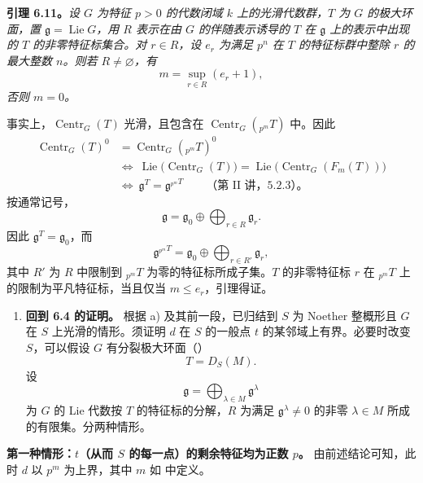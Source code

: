 \textbf{引理 6.11。}\emph{设 \(G\) 为特征 \(p>0\) 的代数闭域 \(k\) 上的光滑代数群，\(T\) 为 \(G\) 的极大环面，置 \(\mathfrak g=\operatorname{Lie}G\)，用 \(R\) 表示在由 \(G\) 的伴随表示诱导的 \(T\) 在 \(\mathfrak g\) 上的表示中出现的 \(T\) 的非零特征标集合。对 \(r\in R\)，设 \(e_r\) 为满足 \(p^n\) 在 \(T\) 的特征标群中整除 \(r\) 的最大整数 \(n\)。则若 \(R\neq\varnothing\)，有
\[
m=\sup_{r\in R}(e_r+1),
\]
否则 \(m=0\)。}

事实上，\(\operatorname{Centr}_G(T)\) 光滑，且包含在 \(\operatorname{Centr}_G({}_{p^m}T)\) 中。因此
\[
\begin{aligned}
\operatorname{Centr}_G(T)^0
 &=\operatorname{Centr}_G({}_{p^m}T)^0\\
&\Longleftrightarrow\
\operatorname{Lie}\bigl(\operatorname{Centr}_G(T)\bigr)
 =\operatorname{Lie}\bigl(\operatorname{Centr}_G(F_m(T))\bigr)\\
&\Longleftrightarrow\
\mathfrak g^T=\mathfrak g^{{}_{p^m}T}
\qquad\text{（第 II 讲，5.2.3）。}
\end{aligned}
\]
按通常记号，
\[
\mathfrak g=\mathfrak g_0\oplus\bigoplus_{r\in R}\mathfrak g_r.
\]
因此 \(\mathfrak g^T=\mathfrak g_0\)，而
\[
\mathfrak g^{{}_{p^m}T}
 =\mathfrak g_0\oplus\bigoplus_{r\in R'}\mathfrak g_r,
\]
其中 \(R'\) 为 \(R\) 中限制到 \({}_{p^m}T\) 为零的特征标所成子集。\(T\) 的非零特征标 \(r\) 在 \({}_{p^m}T\) 上的限制为平凡特征标，当且仅当 \(m\leq e_r\)，引理得证。

\begin{enumerate}
\renewcommand{\labelenumi}{\alph{enumi})}
\setcounter{enumi}{2}
\item \textbf{回到 6.4 的证明。}
根据 a) 及其前一段，已归结到 \(S\) 为 Noether 整概形且 \(G\) 在 \(S\) 上光滑的情形。须证明 \(d\) 在 \(S\) 的一般点 \(t\) 的某邻域上有界。必要时改变 \(S\)，可以假设 \(G\) 有分裂极大环面（）
\[
T=D_S(M).
\]
设
\[
\mathfrak g=\bigoplus_{\lambda\in M}\mathfrak g^\lambda
\]
为 \(G\) 的 Lie 代数按 \(T\) 的特征标的分解，\(R\) 为满足 \(\mathfrak g^\lambda\neq0\) 的非零 \(\lambda\in M\) 所成的有限集。分两种情形。
\end{enumerate}

\textbf{第一种情形：\(t\)（从而 \(S\) 的每一点）的剩余特征均为正数 \(p\)。}
由前述结论可知，此时 \(d\) 以 \(p^m\) 为上界，其中 \(m\) 如  中定义。

